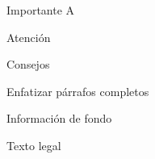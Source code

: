 \begin{important}{Importante}
	A
\end{important}

\begin{warning}{Atención}
	
\end{warning}

\begin{tips}{Consejos}
	
\end{tips}

\begin{overview}{Enfatizar párrafos completos}
	
\end{overview}

\begin{backgroundinformation}{Información de fondo}
	
\end{backgroundinformation}

\begin{legaltext}{Texto legal}
	
\end{legaltext}